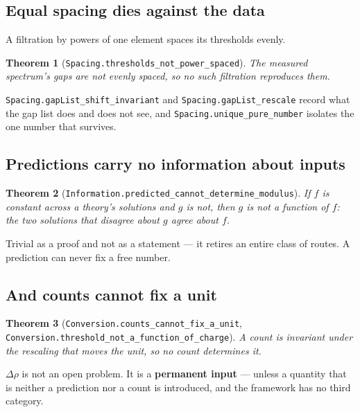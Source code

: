 \documentclass[11pt,a4paper]{article}
\newtheorem{theorem}{Theorem}[section]
\theoremstyle{definition}
\theoremstyle{remark}
\newcommand{\lean}[1]{\texttt{\small #1}}
\begin{document}
\subsection{Equal spacing dies against the data}

A filtration by powers of one element spaces its thresholds evenly.

\begin{theorem}[\lean{Spacing.thresholds\_not\_power\_spaced}]
The measured spectrum's gaps are not evenly spaced, so no such filtration
reproduces them.
\end{theorem}

\lean{Spacing.gapList\_shift\_invariant} and \lean{Spacing.gapList\_rescale} record
what the gap list does and does not see, and \lean{Spacing.unique\_pure\_number}
isolates the one number that survives.

\subsection{Predictions carry no information about inputs}

\begin{theorem}[\lean{Information.predicted\_cannot\_determine\_modulus}]
If $f$ is constant across a theory's solutions and $g$ is not, then $g$ is not a
function of $f$: the two solutions that disagree about $g$ agree about $f$.
\end{theorem}

Trivial as a proof and not as a statement --- it retires an entire class of routes.
A prediction can never fix a free number.

\subsection{And counts cannot fix a unit}

\begin{theorem}[\lean{Conversion.counts\_cannot\_fix\_a\_unit},
\lean{Conversion.threshold\_not\_a\_function\_of\_charge}]
A count is invariant under the rescaling that moves the unit, so no count
determines it.
\end{theorem}

\begin{claimbox}
$\Delta\rho$ is not an open problem. It is a \textbf{permanent input} --- unless a
quantity that is neither a prediction nor a count is introduced, and the framework
has no third category.
\end{claimbox}
\end{document}
